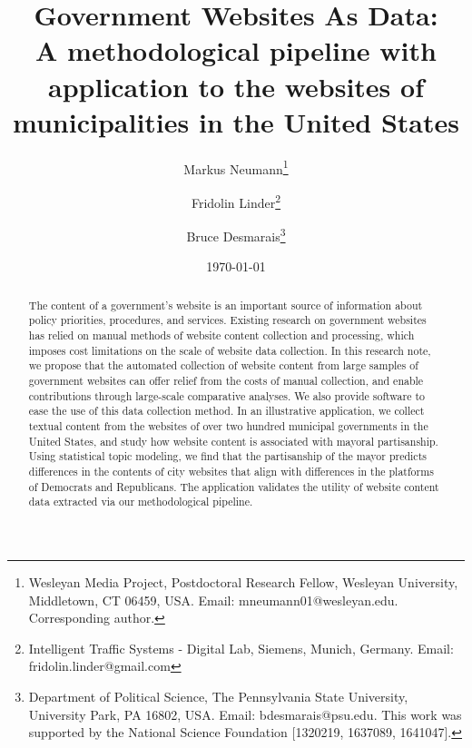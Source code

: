 \documentclass[11pt]{article}
\title{\vspace{-2cm} Government Websites As Data: \\ A methodological pipeline with application to the websites of municipalities in the United States}
\author{ Markus Neumann\footnote{Wesleyan Media Project, Postdoctoral Research Fellow,  Wesleyan University, Middletown, CT 06459, USA. Email: mneumann01@wesleyan.edu. Corresponding author.} \and Fridolin Linder\footnote{Intelligent Traffic Systems - Digital Lab, Siemens, Munich, Germany. Email: fridolin.linder@gmail.com} \and Bruce Desmarais\footnote{Department of Political Science, The Pennsylvania State University, University Park, PA 16802, USA. Email: bdesmarais@psu.edu. This work was supported by the National Science Foundation [1320219, 1637089, 1641047].}} \date{\today}
\begin{document}
\maketitle 




\begin{abstract}

The content of a government's website is an important source of information about policy priorities,  procedures, and services. Existing research on government websites has relied on manual methods of website content collection and processing, which imposes cost limitations on the scale of website data collection. In this research note, we propose that the automated collection of website content from large samples of government websites can offer relief from the costs of manual collection, and enable contributions through large-scale comparative analyses.  We also provide software to ease the use of this data collection method. In an illustrative application, we collect textual content from the websites of over two hundred municipal governments in the United States, and study how website content is associated with mayoral partisanship. Using statistical topic modeling, we find that the partisanship of the mayor predicts differences in the contents of city websites that align with differences in the platforms of Democrats and Republicans. The application validates the utility of website content data extracted via our methodological pipeline.


\end{abstract}
\thispagestyle{empty}
\doublespacing
\end{document}
